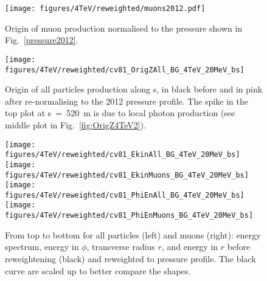 \begin{figure}%
\begin{center}
  \texttt{[image: figures/4TeV/reweighted/muons2012.pdf]}
\end{center}
\vspace{-0.6cm}
 \caption{Origin of muon production normalised to the pressure shown in Fig.~\ref{pressure2012}. 
  \label{fig:method}}
\end{figure}


\begin{figure}
\begin{center}
  \texttt{[image: figures/4TeV/reweighted/cv81\_OrigZAll\_BG\_4TeV\_20MeV\_bs]}
\end{center}
\vspace{-0.6cm}
 \caption{Origin of all particles production along s, in black before and in pink after re-normalising to the 2012 pressure profile. The spike in the top plot at s~=~520~m is due to local photon production (see middle plot in Fig.~\ref{fig:OrigZ4TeV2}).
  \label{fig:OrigZ4TeV}}
\end{figure}

\begin{figure}
\begin{center}
  \texttt{[image: figures/4TeV/reweighted/cv81\_EkinAll\_BG\_4TeV\_20MeV\_bs]}
  \texttt{[image: figures/4TeV/reweighted/cv81\_EkinMuons\_BG\_4TeV\_20MeV\_bs]}
  \texttt{[image: figures/4TeV/reweighted/cv81\_PhiEnAll\_BG\_4TeV\_20MeV\_bs]}
  \texttt{[image: figures/4TeV/reweighted/cv81\_PhiEnMuons\_BG\_4TeV\_20MeV\_bs]}
\end{center}
\vspace{-0.6cm}
 \caption{From top to bottom for all particles (left) and muons (right): energy spectrum, energy in $\phi$, transverse radius $r$, and energy in $r$ before reweightening (black) and reweighted to pressure profile. The black curve are scaled up to better compare the shapes. 
  \label{fig:cv81EkinPhiEn4TeV}} 
\end{figure}


